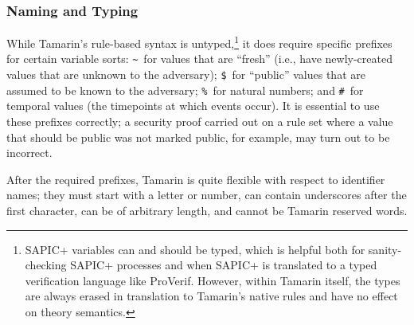\subsubsection{Naming and Typing}

While Tamarin's rule-based syntax is untyped,\footnote{SAPIC+ variables can and should be typed, which is helpful both for sanity-checking SAPIC+ processes and when SAPIC+ is translated to a typed verification language like ProVerif. However, within Tamarin itself, the types are always erased in translation to Tamarin's native rules and have no effect on theory semantics.} it does require specific prefixes for certain variable sorts: \texttt{\textasciitilde}~for values that are ``fresh'' (i.e., have newly-created values that are unknown to the adversary); \texttt{\$}~for ``public'' values that are assumed to be known to the adversary; \texttt{\%}~for natural numbers; and \texttt{\#}~for temporal values (the timepoints at which events occur). It is essential to use these prefixes correctly; a security proof carried out on a rule set where a value that should be public was not marked public, for example, may turn out to be incorrect.

After the required prefixes, Tamarin is quite flexible with respect to identifier names; they must start with a letter or number, can contain underscores after the first character, can be of arbitrary length, and cannot be Tamarin reserved words.

